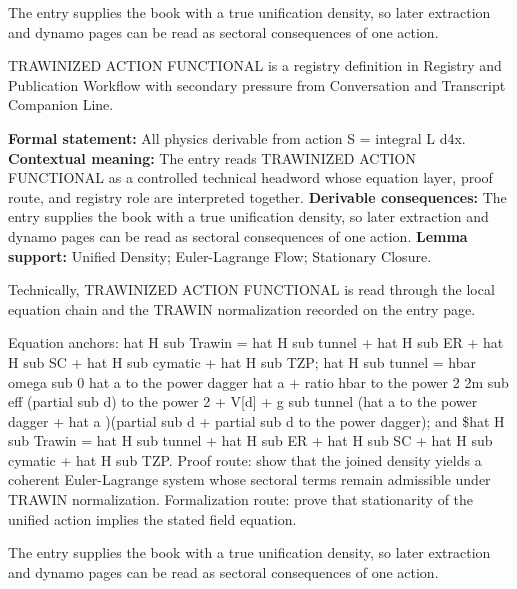 The entry supplies the book with a true unification density, so later extraction and dynamo pages can be read as sectoral consequences of one action.
\clearpage


\begingroup\small
{}
TRAWINIZED ACTION FUNCTIONAL is a registry definition in Registry and Publication Workflow with secondary pressure from Conversation and Transcript Companion Line.

\begingroup\footnotesize\setlength{\emergencystretch}{3em}\sloppy
\textbf{Formal statement:} All physics derivable from action S = integral L d4x. \textbf{Contextual meaning:} The entry reads TRAWINIZED ACTION FUNCTIONAL as a controlled technical headword whose equation layer, proof route, and registry role are interpreted together. \textbf{Derivable consequences:} The entry supplies the book with a true unification density, so later extraction and dynamo pages can be read as sectoral consequences of one action. \textbf{Lemma support:} Unified Density; Euler-Lagrange Flow; Stationary Closure.\par
\endgroup

Technically, TRAWINIZED ACTION FUNCTIONAL is read through the local equation chain and the TRAWIN normalization recorded on the entry page.

Equation anchors: hat H sub Trawin = hat H sub tunnel + hat H sub ER + hat H sub SC + hat H sub cymatic + hat H sub TZP; hat H sub tunnel = hbar omega sub 0 hat a to the power dagger hat a + ratio hbar to the power 2 2m sub eff (partial sub d) to the power 2 + V[d] + g sub tunnel (hat a to the power dagger + hat a )(partial sub d + partial sub d to the power dagger); and \$hat H sub Trawin = hat H sub tunnel + hat H sub ER + hat H sub SC + hat H sub cymatic + hat H sub TZP. Proof route: show that the joined density yields a coherent Euler-Lagrange system whose sectoral terms remain admissible under TRAWIN normalization. Formalization route: prove that stationarity of the unified action implies the stated field equation.

The entry supplies the book with a true unification density, so later extraction and dynamo pages can be read as sectoral consequences of one action.
\endgroup

